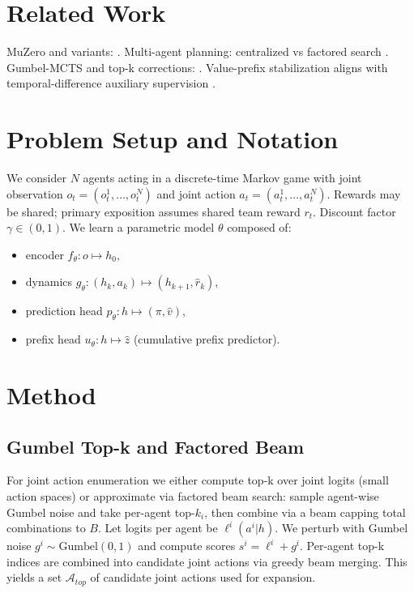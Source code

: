 \documentclass[10pt]{article}
\begin{document}
\section{Related Work}
MuZero and variants: \cite{schrittwieser2019mastering,wang2024efficientzero}. Multi-agent planning: centralized vs factored search \cite{bellemare2024multiagent,madz2020}. Gumbel-MCTS and top-k corrections: \cite{wang2024efficientzero}. Value-prefix stabilization aligns with temporal-difference auxiliary supervision \cite{hafner2023dreamer}.

\section{Problem Setup and Notation}
We consider $N$ agents acting in a discrete-time Markov game with joint observation $o_t=(o_t^1,\dots,o_t^N)$ and joint action $a_t=(a_t^1,\dots,a_t^N)$. Rewards may be shared; primary exposition assumes shared team reward $r_t$. Discount factor $\gamma\in(0,1)$. We learn a parametric model $\theta$ composed of:
\begin{itemize}[noitemsep]
  \item encoder $f_\theta: o \mapsto h_0$,
  \item dynamics $g_\theta: (h_k,a_k)\mapsto (h_{k+1}, \hat r_k)$,
  \item prediction head $p_\theta: h \mapsto (\pi,\hat v)$,
  \item prefix head $u_\theta: h \mapsto \hat z$ (cumulative prefix predictor).
\end{itemize}

\section{Method}
\subsection{Gumbel Top-k and Factored Beam}
For joint action enumeration we either compute top-k over joint logits (small action spaces) or approximate via factored beam search: sample agent-wise Gumbel noise and take per-agent top-$k_i$, then combine via a beam capping total combinations to $B$. Let logits per agent be $\ell^i(a^i|h)$. We perturb with Gumbel noise $g^i\sim\text{Gumbel}(0,1)$ and compute scores $s^i=\ell^i+g^i$. Per-agent top-k indices are combined into candidate joint actions via greedy beam merging. This yields a set $\mathcal{A}_{top}$ of candidate joint actions used for expansion.
\end{document}
